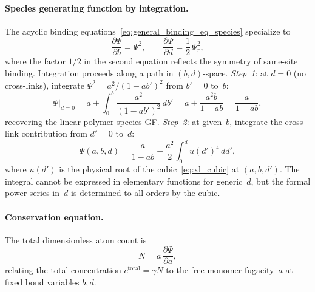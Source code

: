 \documentclass[11pt]{amsart}
\newcommand{\GFcomb}{\Psi}
\newcommand{\PDeriv}[2]{\frac{\partial #1}{\partial #2}}
\theoremstyle{definition}
\theoremstyle{plain}
\theoremstyle{remark}
\begin{document}
\paragraph{Species generating function by integration.}
The acyclic binding equations~\eqref{eq:general_binding_eq_species} specialize to
\begin{equation}\label{eq:xl_binding_eqs}
\PDeriv{\GFcomb}{b} = \Psi^2,
\qquad
\PDeriv{\GFcomb}{d} = \frac{1}{2}\,\Psi_r^2,
\end{equation}
where the factor $1/2$ in the second equation reflects the symmetry of same-site binding.
Integration proceeds along a path in $(b,d)$-space.
\emph{Step~1}: at $d=0$ (no cross-links), integrate $\Psi^2 = a^2/(1-ab')^2$ from $b'=0$ to~$b$:
\[
\GFcomb\big|_{d=0}
= a + \int_0^b \frac{a^2}{(1-ab')^2}\,db'
= a + \frac{a^2 b}{1-ab}
= \frac{a}{1-ab},
\]
recovering the linear-polymer species GF.
\emph{Step~2}: at given~$b$, integrate the cross-link contribution from $d'=0$ to~$d$:
\begin{equation}\label{eq:xl_species_integral}
\GFcomb(a,b,d) = \frac{a}{1-ab} + \frac{a^2}{2}\int_0^d u(d')^4\,dd',
\end{equation}
where $u(d')$ is the physical root of the cubic~\eqref{eq:xl_cubic} at $(a,b,d')$.
The integral cannot be expressed in elementary functions for generic~$d$, but the formal power series in~$d$ is determined to all orders by the cubic.

\paragraph{Conservation equation.}
The total dimensionless atom count is
\begin{equation}\label{eq:xl_conservation}
N = a\,\PDeriv{\GFcomb}{a},
\end{equation}
relating the total concentration $c^{\mathrm{total}} = \gamma N$ to the free-monomer fugacity~$a$ at fixed bond variables $b,d$.
\end{document}
